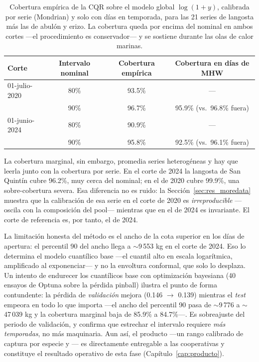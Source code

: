 \begin{table}[htbp]
\centering
\begin{tabular}{lccc}
\toprule
Corte & Intervalo nominal & Cobertura empírica & Cobertura en días de MHW \\
\midrule
01-julio-2020 & 80\% & 93.5\% & --- \\
 & 90\% & 96.7\% & 95.9\% (vs.\ 96.8\% fuera) \\
\midrule
01-junio-2024 & 80\% & 90.9\% & --- \\
 & 90\% & 95.8\% & 92.5\% (vs.\ 96.1\% fuera) \\
\bottomrule
\end{tabular}
\caption{Cobertura empírica de la CQR sobre el modelo global $\log(1+y)$, calibrada por serie
(Mondrian) y solo con días en temporada, para las 21 series de langosta más las de abulón y
erizo. La cobertura queda por encima del nominal en ambos cortes ---el procedimiento es
conservador--- y se sostiene durante las olas de calor marinas.}
\label{tab:extension_cqr}
\end{table}

La cobertura marginal, sin embargo, promedia series heterogéneas y hay que leerla junto con la
cobertura por serie. En el corte de 2024 la langosta de San Quintín cubre 96.2\%, muy cerca del
nominal; en el de 2020 cubre 99.9\%, una sobre-cobertura severa. Esa diferencia no es ruido: la
Sección~\ref{sec:res_moredata} muestra que la calibración de esa serie en el corte de 2020 es
\emph{irreproducible} ---oscila con la composición del pool--- mientras que en el de 2024 es
invariante. El corte de referencia es, por tanto, el de 2024.

La limitación honesta del método es el ancho de la cota superior en los días de apertura: el
percentil 90 del ancho llega a $\sim$9\,553 kg en el corte de 2024. Eso lo determina el modelo
cuantílico base ---el cuantil alto en escala logarítmica, amplificado al exponenciar--- y no la
envoltura conformal, que solo lo desplaza. Un intento de endurecer los cuantílicos base con
optimización bayesiana (40 ensayos de Optuna sobre la pérdida pinball) ilustra el punto de forma
contundente: la pérdida de \emph{validación} mejora (0.146 $\to$ 0.139) mientras el \emph{test}
empeora en todo lo que importa ---el ancho del percentil 90 pasa de $\sim$9\,776 a
$\sim$47\,039 kg y la cobertura marginal baja de 85.9\% a 84.7\%---. Es sobreajuste del periodo
de validación, y confirma que estrechar el intervalo requiere \emph{más temporadas}, no más
maquinaria. Aun así, el producto ---un rango calibrado de captura por especie y \ue{}--- es
directamente entregable a las cooperativas y constituye el resultado operativo de esta fase
(Capítulo~\ref{cap:producto}).

